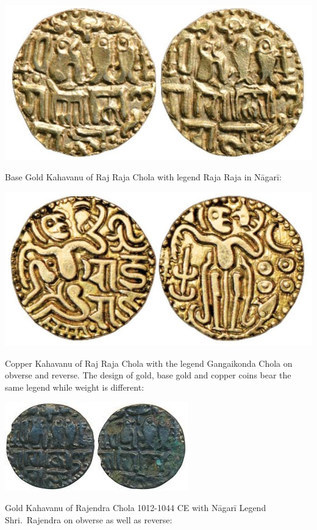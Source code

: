 \vskip 4pt

\centerline{\includegraphics[scale=1]{"images/article-06/art06-fig10.jpg"}}

Base Gold Kahavanu of Raj Raja Chola with legend Raja Raja in Nāgarī:

\vskip 4pt

\centerline{\includegraphics[scale=1]{"images/article-06/art06-fig11.jpg"}}

Copper Kahavanu of Raj Raja Chola with the legend Gangaikonda Chola on obverse and reverse. The design of gold, base gold and copper coins bear the same legend while weight is different:

\centerline{\includegraphics[scale=0.6]{"images/article-06/art06-fig12.jpg"}}

Gold Kahavanu of Rajendra Chola 1012-1044 CE with Nāgarī Legend Shri.\ Rajendra on obverse as well as reverse:

